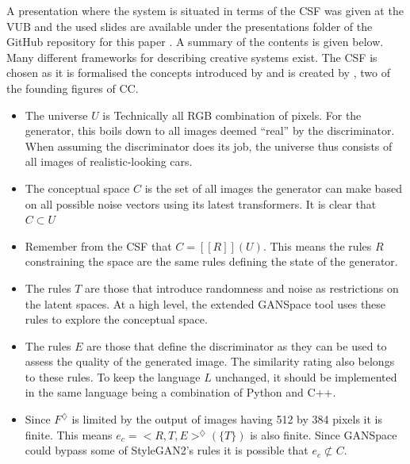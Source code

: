 A presentation where the system is situated in terms of the CSF was given at the VUB and the used slides are available under the presentations folder of the GitHub repository for this paper \citep{github_project}.
A summary of the contents is given below.
Many different frameworks for describing creative systems exist.
The CSF is chosen as it is formalised the concepts introduced by \citet{boden2004creative} and is created by \citet{csf}, two of the founding figures of CC.
\begin{itemize}
    \item The universe $U$ is Technically all RGB combination of pixels. For the generator, this boils down to all images deemed “real” by the discriminator. When assuming the discriminator does its job, the universe thus consists of all images of realistic-looking cars.
    \item The conceptual space $C$ is the set of all images the generator can make based on all possible noise vectors using its latest transformers. It is clear that $ C \subset U$
    \item Remember from the CSF that $C = [[R]](U)$. This means the rules $R$ constraining the space are the same rules defining the state of the generator.
    \item The rules $T$ are those that introduce randomness and noise as restrictions on the latent spaces. At a high level, the extended GANSpace tool uses these rules to explore the conceptual space.
    \item The rules $E$ are those that define the discriminator as they can be used to assess the quality of the generated image. The similarity rating also belongs to these rules. To keep the language $L$ unchanged, it should be implemented in the same language being a combination of Python and C++.
    \item Since $F^\diamondsuit$ is limited by the output of images having 512 by 384 pixels it is finite. This means $e_c = <R, T, E>^\diamondsuit(\{T\})$ is also finite. Since GANSpace could bypass some of StyleGAN2's rules it is possible that $e_c \not\subset C$.
\end{itemize}